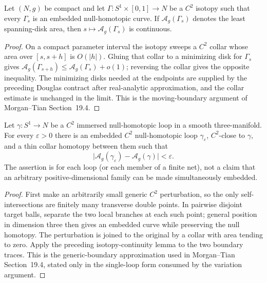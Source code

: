 \begin{lemma}
\label{lem:least-disk-area-continuity-under-isotopy}
\notready
Let $(N,g)$ be compact and let
$\Gamma\colon S^1\times[0,1]\to N$ be a $C^2$ isotopy such that every
$\Gamma_s$ is an embedded null-homotopic curve.  If
$\mathcal A_g(\Gamma_s)$ denotes the least spanning-disk area, then
$s\mapsto\mathcal A_g(\Gamma_s)$ is continuous.
\end{lemma}
\begin{proof}
On a compact parameter interval the isotopy sweeps a $C^2$ collar whose area
over $[s,s+h]$ is $O(|h|)$.  Gluing that collar to a minimizing disk for
$\Gamma_s$ gives
$\mathcal A_g(\Gamma_{s+h})\le\mathcal A_g(\Gamma_s)+o(1)$; reversing the
collar gives the opposite inequality.  The minimizing disks needed at the
endpoints are supplied by the preceding Douglas contract after real-analytic
approximation, and the collar estimate is unchanged in the limit.  This is
the moving-boundary argument of Morgan--Tian Section~19.4.
\end{proof}

\begin{lemma}
\label{lem:immersed-loop-embedded-approximation}
\notready
Let $\gamma\colon S^1\to N$ be a $C^2$ immersed null-homotopic loop in a
smooth three-manifold.  For every $\varepsilon>0$ there is an embedded $C^2$
null-homotopic loop $\gamma_\varepsilon$, $C^2$-close to $\gamma$, and a
thin collar homotopy between them such that
\[
 \bigl|\mathcal A_g(\gamma_\varepsilon)-\mathcal A_g(\gamma)\bigr|<\varepsilon.
\]
The assertion is for each loop (or each member of a finite net), not a claim
that an arbitrary positive-dimensional family can be made simultaneously
embedded.
\end{lemma}
\begin{proof}
First make an arbitrarily small generic $C^2$ perturbation, so the only
self-intersections are finitely many transverse double points.  In pairwise
disjoint target balls, separate the two local branches at each such point;
general position in dimension three then gives an embedded curve while
preserving the null homotopy.  The perturbation is joined to the original by a
collar with area tending to zero.  Apply the preceding isotopy-continuity
lemma to the two boundary traces.  This is the generic-boundary
approximation used in Morgan--Tian Section~19.4, stated only in the
single-loop form consumed by the variation argument.
\end{proof}

